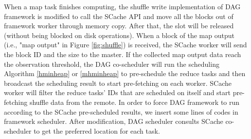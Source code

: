 When a map task finishes computing, the shuffle write implementation of DAG framework is modified to call the SCache API and move all the blocks out of {\color{blue}framework worker} through memory copy. 
After that, the slot will be released (without being blocked on disk operations).
When a block of the map output (i.e., "map output" in Figure \ref{fig:shuffle}) is received, the SCache worker will send the block ID and the size to the master.
If the collected map output data reach the observation threshold, the DAG co-scheduler will run the scheduling Algorithm \ref{hminheap} or \ref{mhminheap} to pre-schedule the reduce tasks and then broadcast the scheduling result to start pre-fetching on each worker.
SCache worker will filter the reduce tasks' IDs that are scheduled on itself and start pre-fetching shuffle data from the remote. 
{\color{blue}
In order to force DAG framework to run according to the SCache pre-scheduled results, we insert some lines of codes in framework scheduler.
After modification, DAG scheduler consults SCache co-scheduler to get the preferred location for each task.
}

